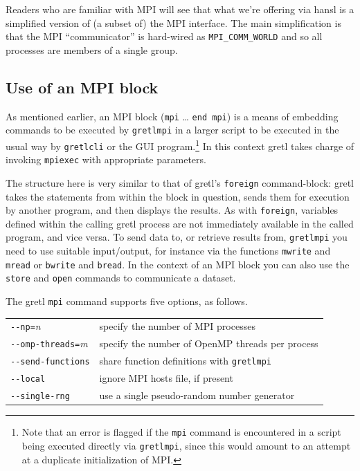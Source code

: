 \documentclass{article}
\begin{document}
\vspace{1ex}

Readers who are familiar with MPI will see that what we're offering
via hansl is a simplified version of (a subset of) the MPI
interface. The main simplification is that the MPI ``communicator'' is
hard-wired as \verb|MPI_COMM_WORLD| and so all processes are members
of a single group.

\subsection{Use of an MPI block}
\label{subsec:mpi-block}

As mentioned earlier, an MPI block (\texttt{mpi} \dots{} \texttt{end
  mpi}) is a means of embedding commands to be executed by
\texttt{gretlmpi} in a larger script to be executed in the usual
way by \texttt{gretlcli} or the GUI program.\footnote{Note that an
  error is flagged if the \texttt{mpi} command is encountered in a
  script being executed directly via \texttt{gretlmpi}, since this
  would amount to an attempt at a duplicate initialization of MPI.}
In this context gretl takes charge of invoking \texttt{mpiexec} with
appropriate parameters.

The structure here is very similar to that of gretl's \texttt{foreign}
command-block: gretl takes the statements from within the block in
question, sends them for execution by another program, and then
displays the results. As with \texttt{foreign}, variables defined
within the calling gretl process are not immediately available in the
called program, and vice versa. To send data to, or retrieve results
from, \texttt{gretlmpi} you need to use suitable input/output, for
instance via the functions \texttt{mwrite} and \texttt{mread} or
\texttt{bwrite} and \texttt{bread}. In the context of an MPI block you
can also use the \texttt{store} and \texttt{open} commands to
communicate a dataset.

The gretl \texttt{mpi} command supports five options, as follows.
\begin{center}
\begin{tabular}{ll}
\verb|--|\texttt{np=}\textsl{n} & specify the number of MPI processes\\
\verb|--|\texttt{omp-threads=}\textsl{m} & 
  specify the number of OpenMP threads per process \\
\verb|--|\texttt{send-functions} & 
  share function definitions with \texttt{gretlmpi} \\
\verb|--|\texttt{local} & ignore MPI hosts file, if present \\
\verb|--|\texttt{single-rng} & 
  use a single pseudo-random number generator
\end{tabular}
\end{center}
\end{document}
